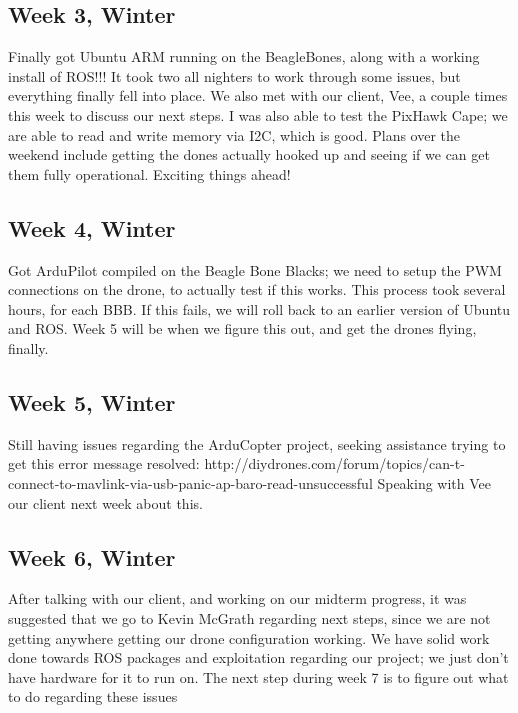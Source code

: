 \documentclass[IEEEtran,letterpaper,10pt,notitlepage,draftclsnofoot,onecolumn]{article}
\begin{document}
\begin{sloppypar}
\subsection{Week 3, Winter}
Finally got Ubuntu ARM running on the BeagleBones, along with a working install of ROS!!! It took two all nighters to work through some issues, but everything finally fell into place. We also met with our client, Vee, a couple times this week to discuss our next steps. I was also able to test the PixHawk Cape; we are able to read and write memory via I2C, which is good. Plans over the weekend include getting the dones actually hooked up and seeing if we can get them fully operational. Exciting things ahead!
\subsection{Week 4, Winter}
Got ArduPilot compiled on the Beagle Bone Blacks; we need to setup the PWM connections on the drone, to actually test if this works. This process took several hours, for each BBB. If this fails, we will roll back to an earlier version of Ubuntu and ROS. Week 5 will be when we figure this out, and get the drones flying, finally.
\subsection{Week 5, Winter}
Still having issues regarding the ArduCopter project, seeking assistance trying to get this error message resolved: http://diydrones.com/forum/topics/can-t-connect-to-mavlink-via-usb-panic-ap-baro-read-unsuccessful Speaking with Vee our client next week about this.
\subsection{Week 6, Winter}
After talking with our client, and working on our midterm progress, it was suggested that we go to Kevin McGrath regarding next steps, since we are not getting anywhere getting our drone configuration working. We have solid work done towards ROS packages and exploitation regarding our project; we just don't have hardware for it to run on. The next step during week 7 is to figure out what to do regarding these issues

\end{sloppypar}
\end{document}
